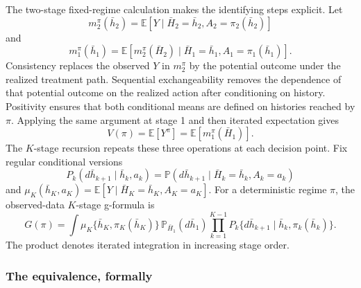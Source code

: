 The two-stage fixed-regime calculation makes the identifying steps explicit. Let
\[
m_2^\pi(\bar h_2)
=\mathbb E[Y\mid \bar H_2=\bar h_2,A_2=\pi_2(\bar h_2)]
\]
and
\[
m_1^\pi(\bar h_1)
=\mathbb E[m_2^\pi(\bar H_2)
\mid \bar H_1=\bar h_1,A_1=\pi_1(\bar h_1)].
\]
Consistency replaces the observed $Y$ in $m_2^\pi$ by the potential outcome under the realized treatment path. Sequential exchangeability removes the dependence of that potential outcome on the realized action after conditioning on history. Positivity ensures that both conditional means are defined on histories reached by $\pi$. Applying the same argument at stage 1 and then iterated expectation gives
\begin{equation}
V(\pi)=\mathbb E[Y^\pi]=\mathbb E[m_1^\pi(\bar H_1)].
\label{eq:two_stage_gformula}
\end{equation}
The $K$-stage recursion repeats these three operations at each decision point.
Fix regular conditional versions
\[
P_k(d\bar h_{k+1}\mid \bar h_k,a_k)
=\mathbb P(d\bar h_{k+1}\mid \bar H_k=\bar h_k,A_k=a_k)
\]
and
$\mu_K(\bar h_K,a_K)=\mathbb E[Y\mid\bar H_K=\bar h_K,A_K=a_K]$.
For a deterministic regime $\pi$, the observed-data $K$-stage g-formula is
\begin{equation}
G(\pi)
=\int \mu_K\{\bar h_K,\pi_K(\bar h_K)\}\,
\mathbb P_{\bar H_1}(d\bar h_1)
\prod_{k=1}^{K-1}
P_k\{d\bar h_{k+1}\mid\bar h_k,\pi_k(\bar h_k)\}.
\label{eq:k_stage_gformula}
\end{equation}
The product denotes iterated integration in increasing stage order.

\subsubsection*{The equivalence, formally}

